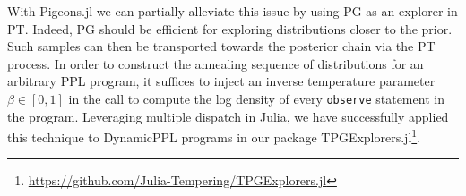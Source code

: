 With Pigeons.jl we can partially alleviate this issue by using PG as an explorer
in PT. Indeed, PG should be efficient for exploring distributions closer to the 
prior. Such samples can then be transported towards the posterior chain via the PT process.
In order to construct the annealing sequence of distributions for an arbitrary 
PPL program, it suffices to inject an inverse temperature parameter 
$\beta\in[0,1]$ in the call to compute the log density of every \texttt{observe} 
statement \citep[see][for an explanation of this syntax]{gordon2014probabilistic} 
in the program. Leveraging multiple dispatch in Julia, we have
successfully applied this technique to DynamicPPL programs in our package
TPGExplorers.jl\footnote{\url{https://github.com/Julia-Tempering/TPGExplorers.jl}}.
